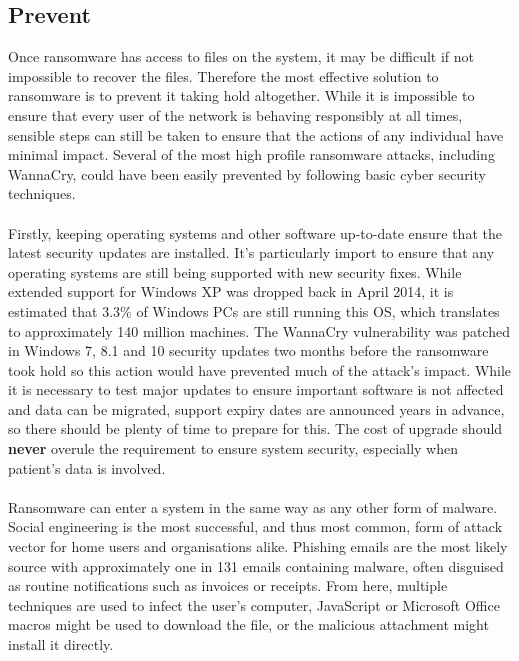 \documentclass{article}
\begin{document}
\subsection{Prevent}
\label{prevent}
Once ransomware has access to files on the system, it may be difficult if not impossible to recover the files. Therefore the most effective solution to ransomware is to prevent it taking hold altogether. While it is impossible to ensure that every user of the network is behaving responsibly at all times, sensible steps can still be taken to ensure that the actions of any individual have minimal impact. Several of the most high profile ransomware attacks, including WannaCry, could have been easily prevented by following basic cyber security techniques\cite{gizmodo_prevent_wannacry}.
\\\\
Firstly, keeping operating systems and other software up-to-date ensure that the latest security updates are installed. It's particularly import to ensure that any operating systems are still being supported with new security fixes.
While extended support for Windows XP was dropped back in April 2014, it is estimated that 3.3\% of Windows PCs are still running this OS, which translates to approximately 140 million machines\cite{statcounter}. The WannaCry vulnerability was patched in Windows 7, 8.1 and 10 security updates\cite{wannacry_patch2, wannacry_patch, windows10march} two months before the ransomware took hold so this action would have prevented much of the attack's impact. While it is necessary to test major updates to ensure important software is not affected and data can be migrated, support expiry dates are announced years in advance\cite{microsoft_lifecycle_factsheet}, so there should be plenty of time to prepare for this. The cost of upgrade should \textbf{never} overule the requirement to ensure system security, especially when patient's data is involved.%
\\\\
Ransomware can enter a system in the same way as any other form of malware. Social engineering is the most successful, and thus most common, form of attack vector for home users and organisations alike.
Phishing emails are the most likely source with approximately one in 131 emails containing malware, often disguised as routine notifications such as invoices or receipts. From here, multiple techniques are used to infect the user's computer, JavaScript or Microsoft Office macros might be used to download the file, or the malicious attachment might install it directly.\cite{symantec_istr}
\end{document}
